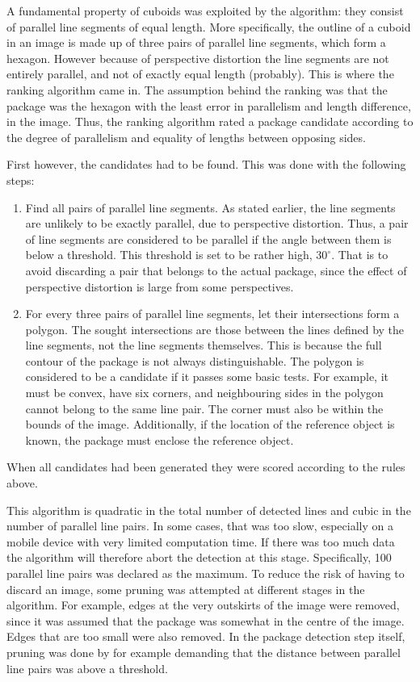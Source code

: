 A fundamental property of cuboids was exploited by the algorithm: they consist of parallel line segments of equal length. 
More specifically, the outline of a cuboid in an image is made up of three pairs of parallel line segments, which form a hexagon. 
However because of perspective distortion the line segments are not entirely parallel, and not of exactly equal length (probably).
This is where the ranking algorithm came in.
The assumption behind the ranking was that the package was the hexagon with the least error in parallelism and length difference, in the image.
Thus, the ranking algorithm rated a package candidate according to the degree of parallelism and equality of lengths between opposing sides.

First however, the candidates had to be found.
This was done with the following steps:
\begin{enumerate}
	\item Find all pairs of parallel line segments. 
		As stated earlier, the line segments are unlikely to be exactly parallel, due to perspective distortion.
		Thus, a pair of line segments are considered to be parallel if the angle between them is below a threshold.
		This threshold is set to be rather high, $30^\circ$. 
		That is to avoid discarding a pair that belongs to the actual package, since the effect of perspective distortion is large from some perspectives. %
	\item For every three pairs of parallel line segments, let their intersections form a polygon.
		The sought intersections are those between the lines defined by the line segments, not the line segments themselves.
		This is because the full contour of the package is not always distinguishable.
		The polygon is considered to be a candidate if it passes some basic tests.
		For example, it must be convex, have six corners, and neighbouring sides in the polygon cannot belong to the same line pair. 
		The corner must also be within the bounds of the image.
		Additionally, if the location of the reference object is known, the package must enclose the reference object.
\end{enumerate}

When all candidates had been generated they were scored according to the rules above.

This algorithm is quadratic in the total number of detected lines and cubic in the number of parallel line pairs.
In some cases, that was too slow, especially on a mobile device with very limited computation time.
If there was too much data the algorithm will therefore abort the detection at this stage.
Specifically, 100 parallel line pairs was declared as the maximum.
To reduce the risk of having to discard an image, some pruning was attempted at different stages in the algorithm.
For example, edges at the very outskirts of the image were removed, since it was assumed that the package was somewhat in the centre of the image.
Edges that are too small were also removed.
In the package detection step itself, pruning was done by for example demanding that the distance between parallel line pairs was above a threshold.

